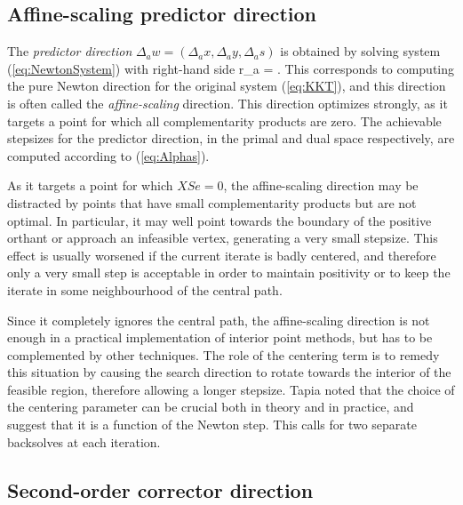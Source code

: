 %
%
\subsection{Affine-scaling predictor direction}

The {\em predictor direction} 
$\Delta_a w = (\Delta_a x, \Delta_a y, \Delta_a s)$ is obtained by solving 
system (\ref{eq:NewtonSystem}) with right-hand side 
\be  \label{eq:PredictorRhs}
 r_a = .
\ee
This corresponds to computing the pure Newton direction for the
original \KKT system (\ref{eq:KKT}), and this direction is often
called the {\em affine-scaling} direction. This 
direction optimizes strongly, as it targets a point for which 
all complementarity products are zero. 
The achievable stepsizes for the predictor direction, 
in the primal and dual space respectively, are computed 
according to (\ref{eq:Alphas}).

As it targets a point for which $XSe = 0$, the affine-scaling direction 
may be distracted by points that have small complementarity products 
but are not optimal. 
In particular, it may well point towards the boundary of the 
positive orthant or approach an infeasible vertex, generating 
a very small stepsize. 
This effect is usually worsened if the current iterate is badly centered, 
and therefore only a very small step is acceptable in order to 
maintain positivity or to keep the iterate in some neighbourhood 
of the central path.

Since it completely ignores the central path, the affine-scaling 
direction is not enough in a practical implementation of 
interior point methods, but has to be 
complemented by other techniques.
The role of the centering term is to remedy this situation by 
causing the search direction to rotate towards the interior 
of the feasible region,
therefore allowing a longer stepsize. 
Tapia \etal \cite{TapiaZhangSaltzmanWeiser} noted that the choice of the 
centering parameter can be crucial both in theory and in practice,
and suggest that it is a function of the Newton step. 
This calls for two separate backsolves at each iteration.

%
%
\subsection{Second-order corrector direction}

